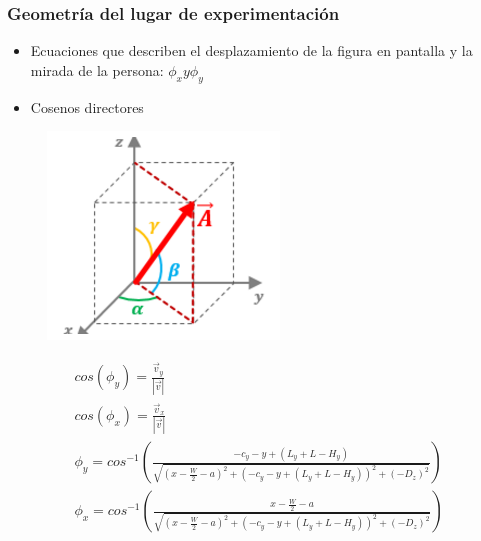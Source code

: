 \documentclass[10pt, compress]{beamer}
\begin{document}
\begin{frame}[fragile]
	\frametitle{Geometría del lugar de experimentación}
	\begin{itemize}
		\item 	Ecuaciones que describen el desplazamiento de la figura en pantalla y la mirada de la persona: $\phi_x y \phi_y$
		\item Cosenos directores
	\end{itemize}
		 \begin{figure}[htbp] 
		 	\centering
		 	\includegraphics[width=.2\textwidth]{./pictures/directores}
		 \end{figure}
		 
		 {\small\begin{eqnarray}
		 cos(\phi_y)=\frac{\vec v_y}{|\vec v|}\\
		 cos(\phi_x)=\frac{\vec v_x}{|\vec v|}\\
		 \phi_y=cos^{-1} (\frac{-c_y-y+(L_y+L-H_y)}{\sqrt{(x-\frac{W}{2}-a)^2+(-c_y-y+(L_y+L-H_y))^2+(-D_z)^2}})\\
		 \phi_x=cos^{-1}(\frac{x-\frac{W}{2}-a}{\sqrt{(x-\frac{W}{2}-a)^2+(-c_y-y+(L_y+L-H_y))^2+(-D_z)^2}})
		 \end{eqnarray}}
\end{frame}	
\end{document}
